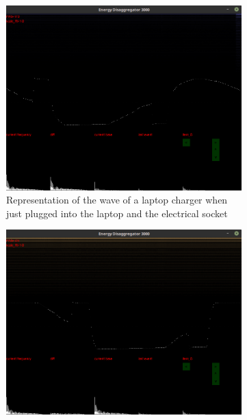 \begin{figure}
\begin{subfigure}{\textwidth}
    \centering
    \includegraphics[trim={0 7cm 0 7cm},clip,width=\textwidth,decodearray={1 0 1 0 1 0}]{img/gui-laptop-start.png}
    \caption{Representation of the wave of a laptop charger when just plugged into the laptop and the electrical socket}
    \label{fig:gui-laptop-start}
\end{subfigure}
\begin{subfigure}{\textwidth}
    \centering
    \includegraphics[trim={0 7cm 0 7cm},clip,width=\textwidth,decodearray={1 0 1 0 1 0}]{img/gui-laptop-eco.png}

\end{subfigure}
\end{figure}
